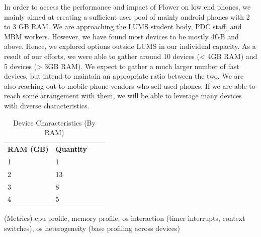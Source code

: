     In order to access the performance and impact of Flower on low end phones, we mainly aimed at creating a sufficient user pool of mainly android phones with 2 to 3 GB RAM. We are approaching the LUMS student body, PDC staff, and MBM workers. However, we have found most devices to be mostly 4GB and above. Hence, we explored options outside LUMS in our individual capacity. As a result of our efforts, we were able to gather around 10 devices (< 4GB RAM) and 5 devices (> 3GB RAM). We expect to gather a much larger number of fast devices, but intend to maintain an appropriate ratio between the two. We are also reaching out to mobile phone vendors who sell used phones. If we are able to reach some arrangement with them, we will be able to leverage many devices with diverse characteristics. \\

    \begin{table}[]
        \begin{tabular}{llll}
        \textbf{RAM (GB)}  & \textbf{Quantity} \\ 
        1                               & 1        \\
        2                               & 13        \\
        3                               & 8        \\
        4                               & 5        \\

        \end{tabular}
        \caption{Device Characteristics (By RAM)} 
    \end{table}

    (Metrics)
    cpu profile, memory profile, os interaction (timer interrupts, context switches), os heterogeneity (base profiling across devices)

